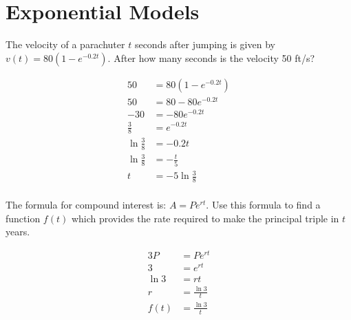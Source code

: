 \documentclass[fleqn,addpoints]{exam}
\begin{document}
\begin{questions}
\begin{solution}[4 cm]
\end{solution}

\pagebreak

\section{Exponential Models}

\question[10]
The velocity of a parachuter $t$ seconds after jumping is given by $v(t) = 80(1 - e^{-0.2t})$.  After how many seconds
is the velocity 50 ft/s?

\begin{solution}[8 cm]

\begin{align*}
  50 &= 80(1 - e^{-0.2t}) \\
  50 &= 80 - 80e^{-0.2t} \\
  - 30 &= -80 e^{-0.2t} \\
  \frac{3}{8} &= e^{-0.2t} \\
  \ln \frac{3}{8} &= -0.2t \\
  \ln \frac{3}{8} &= -\frac{t}{5} \\
  t &= -5 \ln \frac{3}{8} \\
\end{align*}
\end{solution}

\ifprintanswers
\pagebreak
\fi

\question[10]
The formula for compound interest is: $A = P e^{rt}$.  Use this formula to find a function $f(t)$ which provides the
rate required to make the principal triple in $t$ years.

\begin{solution}[7 cm]
\begin{align*}
  3P &= P e^{rt} \\
  3 &= e^{rt} \\
  \ln 3 &= rt \\
  r &= \frac{\ln 3}{t} \\
  f(t) &= \frac{\ln 3}{t} \\
\end{align*}
\end{solution}




\end{questions}
\end{document}

